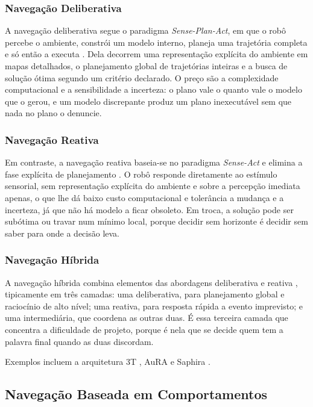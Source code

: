 \subsubsection{Navegação Deliberativa}

A navegação deliberativa segue o paradigma \textit{Sense-Plan-Act}, em que o robô
percebe o ambiente, constrói um modelo interno, planeja uma trajetória completa e só
então a executa \cite{Murphy2000}. Dela decorrem uma representação explícita do ambiente
em mapas detalhados, o planejamento global de trajetórias inteiras e a busca de solução
ótima segundo um critério declarado. O preço são a complexidade computacional e a
sensibilidade a incerteza: o plano vale o quanto vale o modelo que o gerou, e um modelo
discrepante produz um plano inexecutável sem que nada no plano o denuncie.

\subsubsection{Navegação Reativa}

Em contraste, a navegação reativa baseia-se no paradigma \textit{Sense-Act} e elimina a
fase explícita de planejamento \cite{Brooks1986, Arkin1998}. O robô responde diretamente
ao estímulo sensorial, sem representação explícita do ambiente e sobre a percepção
imediata apenas, o que lhe dá baixo custo computacional e tolerância a mudança e a
incerteza, já que não há modelo a ficar obsoleto. Em troca, a solução pode ser subótima
ou travar num mínimo local, porque decidir sem horizonte é decidir sem saber para onde a
decisão leva.

\subsubsection{Navegação Híbrida}
\label{sec:fund-navhibrida}

A navegação híbrida combina elementos das abordagens deliberativa e reativa
\cite{Murphy2000, Arkin1998}, tipicamente em três camadas: uma deliberativa, para
planejamento global e raciocínio de alto nível; uma reativa, para resposta rápida a
evento imprevisto; e uma intermediária, que coordena as outras duas. É essa terceira
camada que concentra a dificuldade de projeto, porque é nela que se decide quem tem a
palavra final quando as duas discordam.

Exemplos incluem a arquitetura 3T \cite{Bonasso1997}, AuRA \cite{Arkin1987} e Saphira \cite{Konolige1997}.

\subsection{Navegação Baseada em Comportamentos}


